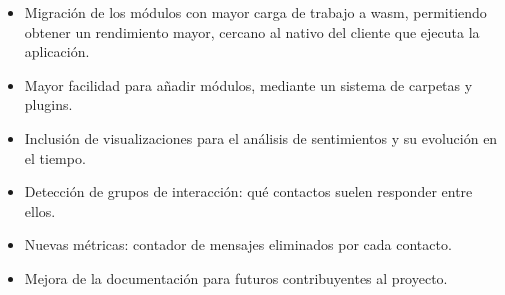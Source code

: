 \begin{itemize}

\item Migración de los módulos con mayor carga de trabajo a \acrfull{wasm}, permitiendo obtener un rendimiento mayor, cercano al nativo del cliente que ejecuta la aplicación.

\item Mayor facilidad para añadir módulos, mediante un sistema de carpetas y plugins.

\item Inclusión de visualizaciones para el análisis de sentimientos y su evolución en el tiempo.

\item Detección de grupos de interacción: qué contactos suelen responder entre ellos.

\item Nuevas métricas: contador de mensajes eliminados por cada contacto.

\item Mejora de la documentación para futuros contribuyentes al proyecto.

\end{itemize}
